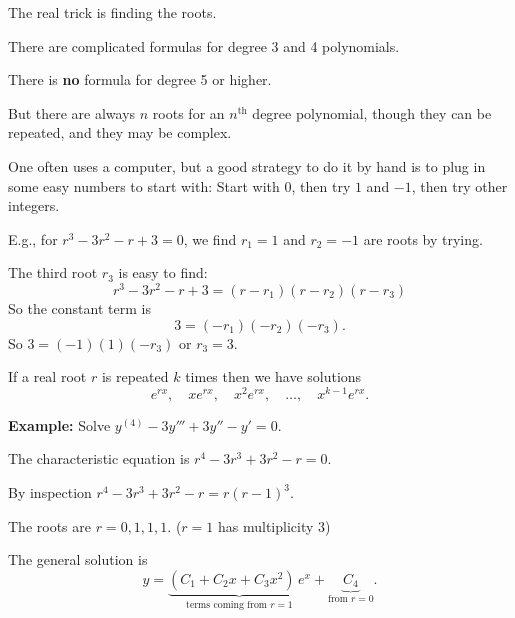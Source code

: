 \documentclass[10pt,aspectratio=169]{beamer}
\begin{document}
\begin{frame}
The real trick is finding the roots.

\medskip
\pause

There are complicated formulas for degree
3 and 4 polynomials.

\medskip
\pause

There is \textbf{no} formula for degree 5 or higher.

\medskip
\pause

But there are always $n$ roots for an 
$n^{\text{th}}$ degree polynomial,
though they can be repeated, and they may be complex.

\medskip
\pause

One often uses a computer, but a good strategy to do it by hand is
to plug in some easy numbers to start with:
Start with $0$, then try $1$ and $-1$, then try other integers.

\medskip
\pause

E.g., for $r^3 - 3 r^2 - r + 3 = 0$, we find $r_1 = 1$ and $r_2 = -1$ are
roots by trying.

\pause
The third root $r_3$ is easy to find:
\pause
\[
r^3 - 3 r^2 - r + 3 = (r-r_1)(r-r_2)(r-r_3)
\]
\pause
So the constant term is
\[
3 = (-r_1)(-r_2)(-r_3) .
\]
\pause
So $3 = (-1)(1)(-r_3)$ or $r_3 = 3$.

\end{frame}

\begin{frame}
If a real root $r$
is repeated $k$ times then we have solutions
\[
e^{rx}, \quad xe^{rx}, \quad x^2 e^{rx}, \quad \ldots, \quad x^{k-1} e^{rx} .
\]

\pause
\textbf{Example:}
Solve $y^{(4)} - 3 y''' + 3 y'' - y' =  0$.

\medskip
\pause

The characteristic equation is \quad $r^4 - 3r^3 + 3r^2 -r = 0$.

\medskip
\pause

By inspection \quad $r^4 - 3r^3 + 3r^2 -r = r{(r-1)}^3$.

\medskip
\pause

The roots are $r = 0, 1, 1, 1$. \quad ($r=1$ has multiplicity $3$)

\medskip
\pause

The general solution is
\[
y = \underbrace{(C_1 + C_2 x + C_3 x^2)\, e^x}_{\text{terms coming from }
r=1} + \underbrace{C_4}_{\text{from } r=0} .
\]

\end{frame}
\end{document}
